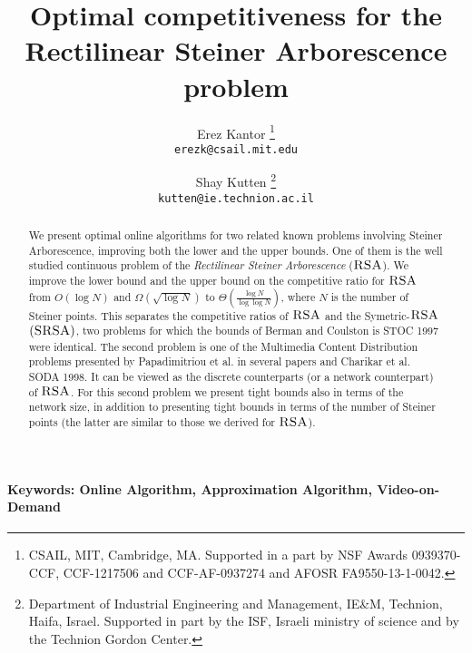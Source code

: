 \documentclass[11pt]{article}
\newcommand{\StRSA}{\mbox{\sc SRSA}}
\newcommand{\RSA}{\mbox{\sc RSA}}
\begin{document}
\title{
Optimal competitiveness for the Rectilinear Steiner Arborescence problem
}

\author{
Erez Kantor
\thanks{CSAIL, MIT, Cambridge, MA.
Supported in a part by NSF Awards 0939370-CCF, CCF-1217506 and  CCF-AF-0937274 and AFOSR FA9550-13-1-0042.
}\\
{\small\tt erezk@csail.mit.edu}
\and
Shay Kutten
\thanks{Department of
Industrial Engineering and Management,
IE\&M, Technion,
Haifa, Israel.  Supported in part by the
ISF,
Israeli ministry of science
and by the Technion Gordon Center.
} \\
{\small\tt kutten@ie.technion.ac.il}
}






\date{}

\maketitle

\begin{abstract}
We present optimal online algorithms for two related known problems involving Steiner Arborescence, improving both the lower and the upper bounds.
One of them is the well studied continuous problem of the {\em Rectilinear Steiner Arborescence} ($\RSA$).
We improve the lower bound and the upper bound on the competitive ratio for $\RSA$ from $O(\log N)$ and $\Omega(\sqrt{\log N})$ to $\Theta(\frac{\log N}{\log \log N})$,
where $N$ is the number of Steiner points.
This separates the competitive ratios of $\RSA$ and the Symetric-$\RSA$ $(\StRSA)$, two problems for which the bounds of Berman and Coulston is STOC 1997 were identical.
The second problem is one of the Multimedia Content Distribution problems presented by Papadimitriou et al. in several papers and Charikar  et al. SODA 1998.
It can be viewed as the discrete counterparts (or a network counterpart) of $\RSA$.
For this second problem we present tight bounds also in terms of the network size,
in addition to presenting tight bounds in terms of the number of Steiner points (the latter are similar to those we derived for $\RSA$).
\end{abstract}

\paragraph*{\bf Keywords: Online Algorithm, Approximation Algorithm, Video-on-Demand}
\end{document}
